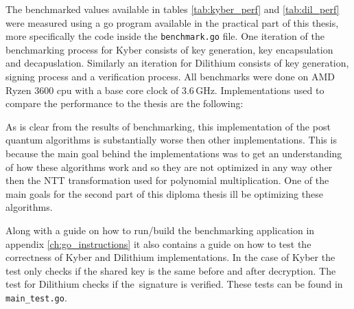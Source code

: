 The benchmarked values available in tables \ref{tab:kyber_perf} and \ref{tab:dil_perf} were measured using a go program available in the practical part of this thesis, more specifically the code inside the \texttt{benchmark.go} file. One iteration of the benchmarking process for Kyber consists of key generation, key encapsulation and decapuslation. Similarly an iteration for Dilithium consists of key generation, signing process and a verification process. All benchmarks were done on AMD Ryzen 3600 cpu with a base core clock of 3.6\,GHz. Implementations used to compare the performance to the thesis are the following:
\begin{itemize}
\end{itemize}
\noindent As is clear from the results of benchmarking, this implementation of the post quantum algorithms is substantially worse then other implementations. This is because the main goal behind the implementations was to get an understanding of how these algorithms work and so they are not optimized in any way other then the NTT transformation used for polynomial multiplication. One of the main goals for the second part of this diploma thesis ill be optimizing these algorithms.

Along with a guide on how to run/build the benchmarking application in appendix \ref{ch:go_instructions} it also contains a guide on how to test the correctness of Kyber and Dilithium implementations. In the case of Kyber the test only checks if the shared key is the same before and after decryption. The test for Dilithium checks if the~signature is verified. These tests can be found in \texttt{main\_test.go}.


